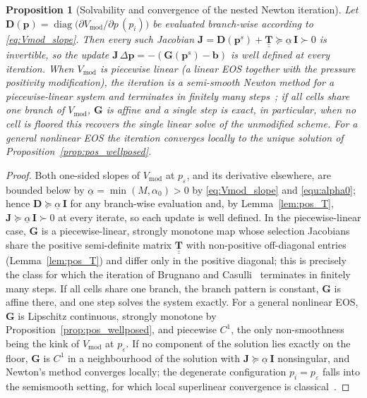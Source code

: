 \documentclass[a4paper,fleqn]{cas-sc}
\newtheorem{proposition}{Proposition}
\theoremstyle{definition}
\theoremstyle{remark}
\begin{document}
\begin{proposition}[Solvability and convergence of the nested Newton iteration]
\label{prop:pos_newton}
Let $\mathbf{D}(\mathbf{p})
=\operatorname{diag}\bigl(\partial V_{\mathrm{mod}}/\partial p\,(p_i)\bigr)$
be evaluated branch-wise according to \eqref{eq:Vmod_slope}. Then every such
Jacobian $\mathbf{J}=\mathbf{D}(\mathbf{p}^{s})+\underline{\underline{\mathbf{T}}}
\succeq\underline{\alpha}\,\mathbf{I}\succ0$ is invertible, so the update
$\mathbf{J}\,\Delta\mathbf{p}=-(\mathbf{G}(\mathbf{p}^{s})-\mathbf{b})$ is well
defined at every iteration. When $V_{\mathrm{mod}}$ is piecewise linear (a linear
EOS together with the pressure positivity modification), the iteration is a semi-smooth
Newton method for a piecewise-linear system and terminates in finitely many
steps~\cite{BrugnanoCasulli2009}; if all cells share one branch of
$V_{\mathrm{mod}}$, $\mathbf{G}$ is affine and a single step is exact, in
particular, when no cell is floored this recovers the single linear solve of
the unmodified scheme. For a general nonlinear EOS the iteration converges
locally to the unique solution of Proposition~\ref{prop:pos_wellposed}.
\end{proposition}
\begin{proof}
Both one-sided slopes of $V_{\mathrm{mod}}$ at $p_{\varepsilon}$, and its
derivative elsewhere, are bounded below by
$\underline{\alpha}=\min(M,\alpha_0)>0$ by \eqref{eq:Vmod_slope} and
\eqref{equ:alpha0}; hence $\mathbf{D}\succeq\underline{\alpha}\,\mathbf{I}$ for
any branch-wise evaluation and, by Lemma~\ref{lem:pos_T},
$\mathbf{J}\succeq\underline{\alpha}\,\mathbf{I}\succ0$ at every iterate, so
each update is well defined. In the piecewise-linear case, $\mathbf{G}$ is a
piecewise-linear, strongly monotone map whose selection Jacobians share the positive semi-definite matrix $\underline{\underline{\mathbf{T}}}$
with non-positive off-diagonal entries (Lemma~\ref{lem:pos_T}) and differ only
in the positive diagonal; this is precisely the class for which the iteration
of Brugnano and Casulli~\cite{BrugnanoCasulli2009} terminates in finitely many
steps. If all cells share one branch, the branch pattern is constant,
$\mathbf{G}$ is affine there, and one step solves the system exactly. For a
general nonlinear EOS, $\mathbf{G}$ is Lipschitz continuous, strongly monotone
by Proposition~\ref{prop:pos_wellposed}, and piecewise $C^{1}$, the only
non-smoothness being the kink of $V_{\mathrm{mod}}$ at $p_{\varepsilon}$. If no
component of the solution lies exactly on the floor, $\mathbf{G}$ is $C^{1}$
in a neighbourhood of the solution with
$\mathbf{J}\succeq\underline{\alpha}\,\mathbf{I}$ nonsingular, and Newton's
method converges locally; the degenerate configuration
$p_i=p_{\varepsilon}$ falls into the semismooth setting, for which local
superlinear convergence is classical~\cite{QiSun1993}.
\end{proof}
\end{document}
